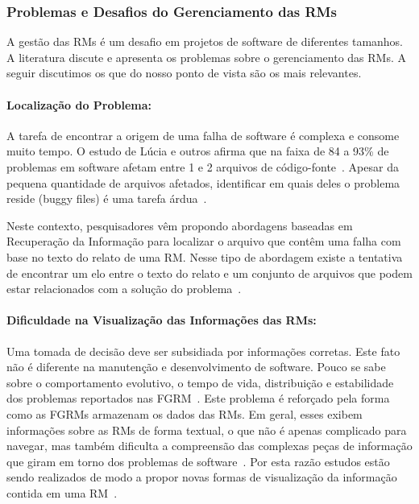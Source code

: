 \subsubsection{Problemas e Desafios do Gerenciamento das RMs}
\label{ssub:problemas_relacionadas_rm}

A gestão das RMs é um desafio em projetos de software de diferentes tamanhos. A
literatura discute e apresenta os problemas sobre o gerenciamento das RMs. A
seguir discutimos os que do nosso ponto de vista são os mais relevantes.

\paragraph{Localização do Problema:}

A tarefa de encontrar a origem de uma falha de software é complexa e consome
muito tempo. O estudo de Lúcia e outros afirma que na faixa de 84 a 93\% de
problemas em software afetam entre 1 e 2 arquivos de
código-fonte~\cite{thung2012faults}. Apesar da pequena quantidade de arquivos
afetados, identificar em quais deles o problema reside (buggy files) é uma
tarefa árdua~\cite{Thung:2014:BIT:2635868.2661678}.

Neste contexto, pesquisadores vêm propondo abordagens baseadas em Recuperação da
Informação para localizar o arquivo que contêm uma falha com base no texto do
relato de uma RM\@. Nesse tipo de abordagem existe a tentativa de encontrar um
elo entre o texto do relato e um conjunto de arquivos que podem estar
relacionados com a solução do problema~\cite{Wong:2014:BBF:2705615.2706096}.

\paragraph{Dificuldade na Visualização das Informações das RMs:}

Uma tomada de decisão deve ser subsidiada por informações corretas. Este fato
não é diferente na manutenção e desenvolvimento de software. Pouco se sabe sobre
o comportamento evolutivo, o tempo de vida, distribuição e estabilidade dos
problemas reportados nas FGRM~\cite{hora2012bug}. Este problema é reforçado pela
forma como as FGRMs armazenam os dados das RMs. Em geral, esses exibem
informações sobre as RMs de forma textual, o que não é apenas complicado para
navegar, mas também dificulta a compreensão das complexas peças de informação
que giram em torno dos problemas de software~\cite{dal2014bug}. Por esta razão
estudos estão sendo realizados de modo a propor novas formas de visualização da
informação contida em uma RM~\cite{takama2013application,hora2012bug}.

